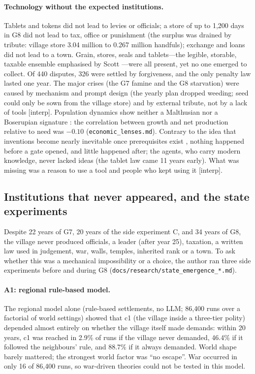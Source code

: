 \documentclass[11pt]{article}
\newcommand{\lbl}[1]{\textsf{[#1]}}
\begin{document}
\paragraph{Technology without the expected institutions.} Tablets and tokens did not lead to levies or officials; a store of up to 1{,}200 days in G8 did not lead to tax, office or punishment (the surplus was drained by tribute: village store 3.04 million to 0.267 million handfuls); exchange and loans did not lead to a town. Grain, stores, seals and tablets---the legible, storable, taxable ensemble emphasised by Scott \citep{scott2017against}---were all present, yet no one emerged to collect. Of 440 disputes, 326 were settled by forgiveness, and the only penalty law lasted one year. The major crises (the G7 famine and the G8 starvation) were caused by mechanism and prompt design (the yearly plan dropped weeding; seed could only be sown from the village store) and by external tribute, not by a lack of tools \lbl{interp}. Population dynamics show neither a Malthusian nor a Boserupian signature \citep{boserup1965conditions}: the correlation between growth and net production relative to need was $-0.10$ (\texttt{economic\_lenses.md}). Contrary to the idea that inventions become nearly inevitable once prerequisites exist \citep{ogburn1922inventions}, nothing happened before a gate opened, and little happened after; the agents, who carry modern knowledge, never lacked ideas (the tablet law came 11 years early). What was missing was a reason to use a tool and people who kept using it \lbl{interp}.

\subsection{Institutions that never appeared, and the state experiments}
\label{sec:state}

Despite 22 years of G7, 20 years of the side experiment C, and 34 years of G8, the village never produced officials, a leader (after year 25), taxation, a written law used in judgement, war, walls, temples, inherited rank or a town. To ask whether this was a mechanical impossibility or a choice, the author ran three side experiments before and during G8 (\texttt{docs/research/state\_emergence\_*.md}).

\paragraph{A1: regional rule-based model.} The regional model alone (rule-based settlements, no LLM; 86{,}400 runs over a factorial of world settings) showed that c1 (the village inside a three-tier polity) depended almost entirely on whether the village itself made demands: within 20 years, c1 was reached in 2.9\% of runs if the village never demanded, 46.4\% if it followed the neighbours' rule, and 88.7\% if it always demanded. World shape barely mattered; the strongest world factor was ``no escape''. War occurred in only 16 of 86{,}400 runs, so war-driven theories \citep{carneiro1970theory,turchin2013war} could not be tested in this model.
\end{document}
